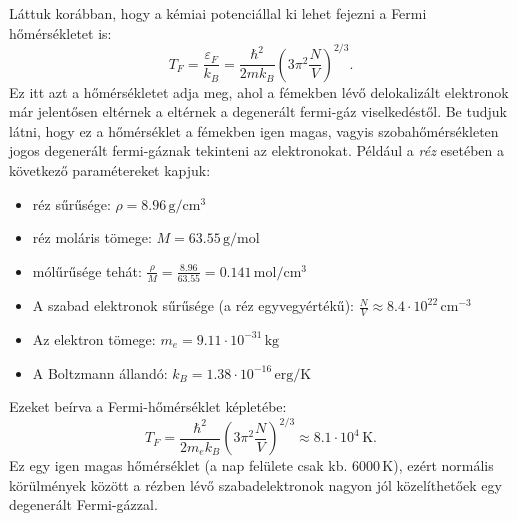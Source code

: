 \documentclass[../main.tex]{subfiles}
\begin{document}
Láttuk korábban, hogy a kémiai potenciállal ki lehet fejezni a Fermi hőmérsékletet is:
\begin{equation}
    T_F = \frac{\varepsilon_F}{k_B} = \frac{\hbar^2}{2m k_B} (3 \pi^2 \frac{N}{V})^{2/3}.
\end{equation}
Ez itt azt a hőmérsékletet adja meg, ahol a fémekben lévő delokalizált elektronok már jelentősen eltérnek a eltérnek a degenerált fermi-gáz viselkedéstől. Be tudjuk látni, hogy ez a hőmérséklet 
a fémekben igen magas, vagyis szobahőmérsékleten jogos degenerált fermi-gáznak tekinteni az elektronokat. Például a \textit{réz} esetében a következő paramétereket kapjuk:
\begin{itemize}
    \item réz sűrűsége: $\rho = 8.96 \, \mathrm{g/cm^3}$
    \item réz moláris tömege: $M = 63.55 \, \mathrm{g/mol}$
    \item mólűrűsége tehát: $\frac{\rho}{M} = \frac{8.96}{63.55} = 0.141 \, \mathrm{mol/cm^3}$
    \item A szabad elektronok sűrűsége (a réz egyvegyértékű): $\frac{N}{V} \approx 8.4 \cdot 10^{22} \, \mathrm{cm^{-3}}$
    \item Az elektron tömege: $m_e = 9.11 \cdot 10^{-31} \, \mathrm{kg}$
    \item A Boltzmann állandó: $k_B = 1.38 \cdot 10^{-16} \, \mathrm{erg/K}$
\end{itemize}
Ezeket beírva a Fermi-hőmérséklet képletébe:
\begin{equation}
    T_F = \frac{\hbar^2}{2m_e k_B} (3 \pi^2 \frac{N}{V})^{2/3} \approx 8.1 \cdot 10^4 \, \mathrm{K}.
\end{equation}
Ez egy igen magas hőmérséklet (a nap felülete csak kb. $6000 \, \mathrm{K}$), ezért normális körülmények között a rézben lévő szabadelektronok nagyon jól közelíthetőek egy degenerált Fermi-gázzal.
\end{document}

